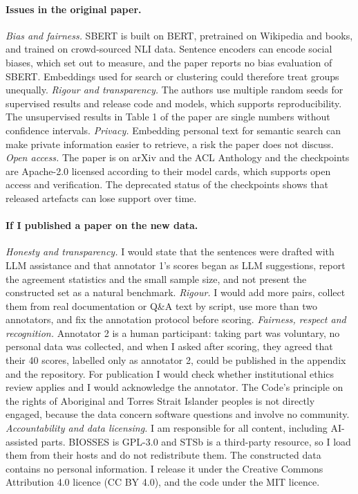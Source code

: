 \documentclass[11pt]{article}
\begin{document}
\paragraph{Issues in the original paper.}
\emph{Bias and fairness.} SBERT is built on BERT, pretrained on Wikipedia and books, and trained on crowd-sourced NLI data. Sentence encoders can encode social biases, which \citet{may2019measuring} set out to measure, and the paper reports no bias evaluation of SBERT. Embeddings used for search or clustering could therefore treat groups unequally. \emph{Rigour and transparency.} The authors use multiple random seeds for supervised results and release code and models, which supports reproducibility. The unsupervised results in Table 1 of the paper are single numbers without confidence intervals. \emph{Privacy.} Embedding personal text for semantic search can make private information easier to retrieve, a risk the paper does not discuss. \emph{Open access.} The paper is on arXiv and the ACL Anthology and the checkpoints are Apache-2.0 licensed according to their model cards, which supports open access and verification. The deprecated status of the checkpoints shows that released artefacts can lose support over time.

\paragraph{If I published a paper on the new data.}
\emph{Honesty and transparency.} I would state that the sentences were drafted with LLM assistance and that annotator 1's scores began as LLM suggestions, report the agreement statistics and the small sample size, and not present the constructed set as a natural benchmark. \emph{Rigour.} I would add more pairs, collect them from real documentation or Q\&A text by script, use more than two annotators, and fix the annotation protocol before scoring. \emph{Fairness, respect and recognition.} Annotator 2 is a human participant: taking part was voluntary, no personal data was collected, and when I asked after scoring, they agreed that their 40 scores, labelled only as annotator 2, could be published in the appendix and the repository. For publication I would check whether institutional ethics review applies and I would acknowledge the annotator. The Code's principle on the rights of Aboriginal and Torres Strait Islander peoples is not directly engaged, because the data concern software questions and involve no community. \emph{Accountability and data licensing.} I am responsible for all content, including AI-assisted parts. BIOSSES is GPL-3.0 and STSb is a third-party resource, so I load them from their hosts and do not redistribute them. The constructed data contains no personal information. I release it under the Creative Commons Attribution 4.0 licence (CC BY 4.0), and the code under the MIT licence.
\end{document}
